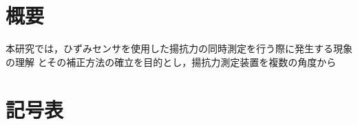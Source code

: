 
\maketitle
\section*{概要}

本研究では，ひずみセンサを使用した揚抗力の同時測定を行う際に発生する現象の理解
とその補正方法の確立を目的とし，揚抗力測定装置を複数の角度から



\newpage
\setcounter{tocdepth}{2}
\tableofcontents
\newpage

\section*{記号表}
